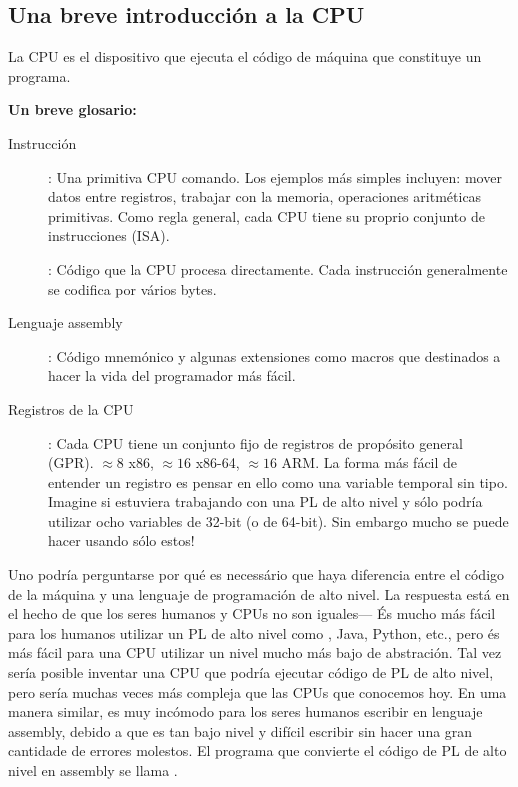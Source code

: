 \subsection{Una breve introducción a la CPU}

La \ac{CPU} es el dispositivo que ejecuta el código de máquina que constituye un programa.

\textbf{Un breve glosario:}

\begin{description}
\item[Instrucción]: Una primitiva \ac{CPU} comando.
Los ejemplos más simples incluyen: mover datos entre registros, trabajar con la memoria, operaciones aritméticas primitivas.
Como regla general, cada \ac{CPU} tiene su proprio conjunto de instrucciones (\ac{ISA}).

\item[\ESph{}]: Código que la \ac{CPU} procesa directamente. 
Cada instrucción generalmente se codifica por vários bytes.
\item[Lenguaje assembly]: Código mnemónico y algunas extensiones como macros que destinados a hacer la vida del programador más fácil.
\item[Registros de la CPU]: 
Cada \ac{CPU} tiene un conjunto fijo de registros de propósito general (\ac{GPR}).
$\approx 8$ \ESph{} x86, $\approx 16$ \ESph{} x86-64, $\approx 16$ \ESph{} ARM.
La forma más fácil de entender un registro es pensar en ello como una variable temporal sin tipo.
Imagine si estuviera trabajando con una \ac{PL} de alto nivel y sólo podría utilizar ocho variables de 32-bit (o de 64-bit).
Sin embargo mucho se puede hacer usando sólo estos!
\end{description}

Uno podría perguntarse por qué es necessário que haya diferencia entre el código de la máquina y una lenguaje de programación de alto nivel.  La respuesta está en el hecho de que los seres humanos y CPUs no son iguales---%
És mucho más fácil para los humanos utilizar un \ac{PL} de alto nivel como \CCpp, Java, Python, etc., pero és más fácil para una \ac{CPU} utilizar un nivel mucho más bajo de abstración.
Tal vez sería posible inventar una \ac{CPU} que podría ejecutar código de \ac{PL} de alto nivel, pero sería muchas veces más compleja que las \ac{CPU}s que conocemos hoy.
En uma manera similar, es muy incómodo para los seres humanos escribir en lenguaje assembly, debido a que es tan bajo nivel y difícil escribir sin hacer una gran cantidade de errores molestos.
El programa que convierte el código de \ac{PL} de alto nivel en assembly se llama .

